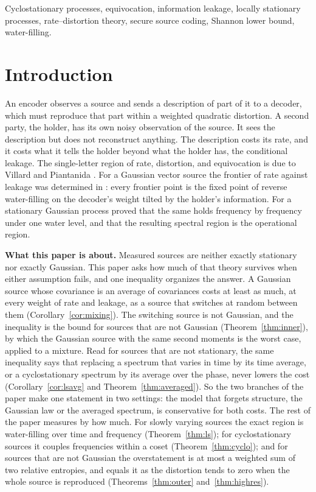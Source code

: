 \documentclass[11pt,onecolumn]{IEEEtran}
\begin{document}
\begin{IEEEkeywords}
Cyclostationary processes, equivocation, information leakage, locally
stationary processes, rate--distortion theory, secure source coding,
Shannon lower bound, water-filling.
\end{IEEEkeywords}

\section{Introduction}
\label{sec:intro}

An encoder observes a source and sends a description of part of it to
a decoder, which must reproduce that part within a weighted quadratic
distortion. A second party, the holder, has its own noisy observation
of the source. It sees the description but does not reconstruct
anything. The description costs its rate, and it costs what it tells
the holder beyond what the holder has, the conditional leakage. The
single-letter region of rate, distortion, and equivocation is due to
Villard and Piantanida \cite{villard2013}. For a Gaussian vector
source the frontier of rate against leakage was determined in
\cite{part1}: every frontier point is the fixed point of reverse
water-filling on the decoder's weight tilted by the holder's
information. For a stationary Gaussian process \cite{part2} proved that
the same holds frequency by frequency under one water level, and that
the resulting spectral region is the operational region.

\textbf{What this paper is about.} Measured sources are neither exactly
stationary nor exactly Gaussian. This paper asks how much of that theory
survives when either assumption fails, and one inequality organizes the
answer. A Gaussian source whose covariance is an average of covariances
costs at least as much, at every weight of rate and leakage, as a source
that switches at random between them (Corollary~\ref{cor:mixing}). The
switching source is not Gaussian, and the inequality is the bound for
sources that are not Gaussian (Theorem~\ref{thm:inner}), by which the
Gaussian source with the same second moments is the worst case, applied
to a mixture. Read for sources that are not stationary, the same
inequality says that replacing a spectrum that varies in time by its
time average, or a cyclostationary spectrum by its average over the
phase, never lowers the cost (Corollary~\ref{cor:lsavg} and
Theorem~\ref{thm:averaged}). So the two branches of the paper make one
statement in two settings: the model that forgets structure, the
Gaussian law or the averaged spectrum, is conservative for both costs.
The rest of the paper measures by how much. For slowly varying sources
the exact region is water-filling over time and frequency
(Theorem~\ref{thm:ls}); for cyclostationary sources it couples
frequencies within a coset (Theorem~\ref{thm:cyclo}); and for sources that
are not Gaussian the overstatement is at most a weighted sum of two
relative entropies, and equals it as the distortion tends to zero when
the whole source is reproduced (Theorems~\ref{thm:outer}
and~\ref{thm:highres}).
\end{document}
